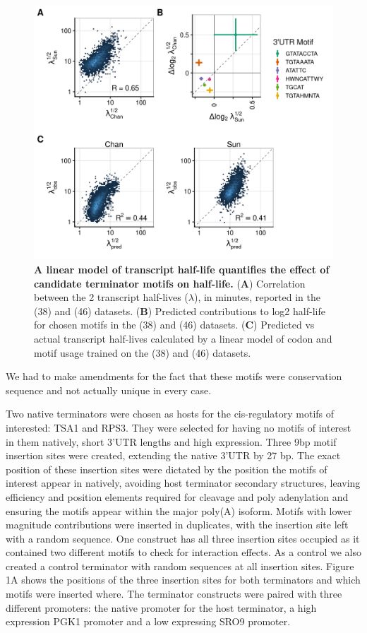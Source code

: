 \documentclass{SBCbookchapter}
\begin{document}
\begin{figure}[p]

{\centering \includegraphics[width=0.98\linewidth]{figures/hlife_model_multi_fig} 

}

\caption{\textbf{A linear model of transcript half-life quantifies the effect of candidate terminator motifs on half-life.} (\textbf{A}) Correlation between the 2 transcript half-lives (\(\lambda\)), in minutes, reported in the (38) and (46) datasets. (\textbf{B}) Predicted contributions to log2 half-life for chosen motifs in the (38) and (46) datasets. (\textbf{C}) Predicted vs actual transcript half-lives calculated by a linear model of codon and motif usage trained on the (38) and (46) datasets.}\label{fig:hlife-decay-model}
\end{figure}


We had to make amendments for the fact that these motifs were conservation sequence and not actually unique in every case.


Two native terminators were chosen as hosts for the cis-regulatory motifs of interested: TSA1 and RPS3. They were selected for having no motifs of interest in them natively, short 3'UTR lengths and high expression. Three 9bp motif insertion sites were created, extending the native 3'UTR by 27 bp. The exact position of these insertion sites were dictated by the position the motifs of interest appear in natively, avoiding host terminator secondary structures, leaving efficiency and position elements required for cleavage and poly adenylation and ensuring the motifs appear within the major poly(A) isoform. Motifs with lower magnitude contributions were inserted in duplicates, with the insertion site left with a random sequence. One construct has all three insertion sites occupied as it contained two different motifs to check for interaction effects. As a control we also created a control terminator with random sequences at all insertion sites. Figure 1A shows the positions of the three insertion sites for both terminators and which motifs were inserted where. The terminator constructs were paired with three different promoters: the native promoter for the host terminator, a high expression PGK1 promoter and a low expressing SRO9 promoter.
\end{document}
